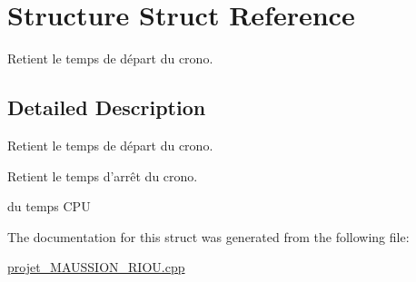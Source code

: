 \hypertarget{structStructure}{\section{\-Structure \-Struct \-Reference}
\label{structStructure}
}


\-Retient le temps de départ du crono.  




\subsection{\-Detailed \-Description}
\-Retient le temps de départ du crono. 

\-Retient le temps d'arrêt du crono.

du temps \-C\-P\-U 

\-The documentation for this struct was generated from the following file\-:\begin{DoxyCompactItemize}
\item 
\hyperlink{projet__MAUSSION__RIOU_8cpp}{projet\-\_\-\-M\-A\-U\-S\-S\-I\-O\-N\-\_\-\-R\-I\-O\-U.\-cpp}\end{DoxyCompactItemize}
